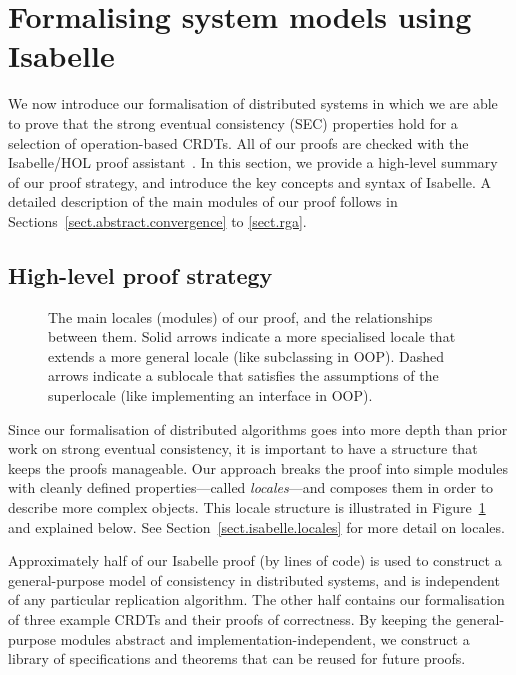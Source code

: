 \section{Formalising system models using Isabelle}
\label{sect.isabelle}

We now introduce our formalisation of distributed systems in which we are able to prove that the strong eventual consistency (SEC) properties hold for a selection of operation-based CRDTs.
All of our proofs are checked with the Isabelle/HOL proof assistant~\cite{DBLP:conf/tphol/WenzelPN08}.
In this section, we provide a high-level summary of our proof strategy, and introduce the key concepts and syntax of Isabelle.
A detailed description of the main modules of our proof follows in Sections~\ref{sect.abstract.convergence} to \ref{sect.rga}.

\subsection{High-level proof strategy}
\label{sect.high-level.proof.strategy}

\begin{figure}
\centering

\caption{The main locales (modules) of our proof, and the relationships between them.
Solid arrows indicate a more specialised locale that extends a more general locale (like subclassing in OOP).
Dashed arrows indicate a sublocale that satisfies the assumptions of the superlocale (like implementing an interface in OOP).
}\label{fig.proof.structure}
\end{figure}

Since our formalisation of distributed algorithms goes into more depth than prior work on strong eventual consistency, it is important to have a structure that keeps the proofs manageable.
Our approach breaks the proof into simple modules with cleanly defined properties---called \emph{locales}---and composes them in order to describe more complex objects.
This locale structure is illustrated in Figure~\ref{fig.proof.structure} and explained below.
See Section~\ref{sect.isabelle.locales} for more detail on locales.

Approximately half of our Isabelle proof (by lines of code) is used to construct a general-purpose model of consistency in distributed systems, and is independent of any particular replication algorithm.
The other half contains our formalisation of three example CRDTs and their proofs of correctness.
By keeping the general-purpose modules abstract and implementation-independent, we construct a library of specifications and theorems that can be reused for future proofs.

